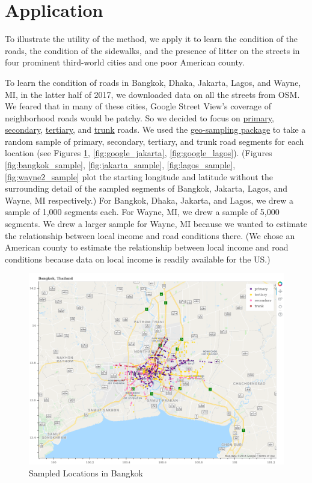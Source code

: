 \documentclass[12pt, letterpaper]{article}
\begin{document}
\section*{Application}

To illustrate the utility of the method, we apply it to learn the condition of the roads, the condition of the sidewalks, and the presence of litter on the streets in four prominent third-world cities and one poor American county.

To learn the condition of roads in Bangkok, Dhaka, Jakarta, Lagos, and Wayne, MI, in the latter half of 2017, we downloaded data on all the streets from OSM. We feared that in many of these cities, Google Street View's coverage of neighborhood roads would be patchy. So we decided to focus on \href{https://wiki.openstreetmap.org/wiki/Tag:highway=primary}{primary}, \href{https://wiki.openstreetmap.org/wiki/Tag:highway=secondary}{secondary}, \href{https://wiki.openstreetmap.org/wiki/Tag:highway=tertiary}{tertiary}, and \href{https://wiki.openstreetmap.org/wiki/Tag:highway=trunk}{trunk} roads. We used the \href{https://github.com/geosensing/geo_sampling}{geo-sampling package} to take a random sample of primary, secondary, tertiary, and trunk road segments for each location (see Figures \ref{fig:google_bangkok}, \ref{fig:google_jakarta}, \ref{fig:google_lagos}). (Figures \ref{fig:bangkok_sample}, \ref{fig:jakarta_sample}, \ref{fig:lagos_sample}, \ref{fig:wayne2_sample} plot the starting longitude and latitude without the surrounding detail of the sampled segments of Bangkok, Jakarta, Lagos, and Wayne, MI respectively.) For Bangkok, Dhaka, Jakarta, and Lagos,  we drew a sample of 1,000 segments each. For Wayne, MI, we drew a sample of 5,000 segments. We drew a larger sample for Wayne, MI because we wanted to estimate the relationship between local income and road conditions there. (We chose an American county to estimate the relationship between local income and road conditions because data on local income is readily available for the US.)

\begin{figure}[H]
\centering
\caption{Sampled Locations in Bangkok} \label{fig:google_bangkok}
    \includegraphics[width=\textwidth]{../figs/bangkok-gmap.png}
\end{figure}
\end{document}

